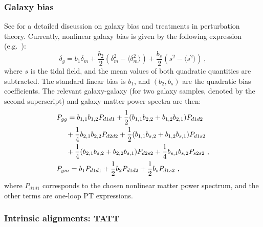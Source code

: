 \documentclass[\docopts]{\docclass}
\begin{document}
\subsubsection{Galaxy bias}
See \cite{desjacques18rev} for a detailed discussion on galaxy bias and treatments in perturbation theory. Currently, nonlinear galaxy bias is given by the following expression (e.g.\ \citealp{baldauf12}):
\begin{equation}
  \delta_{g} = b_1 \delta_m +\frac{b_2}{2} (\delta_m^2 - \langle \delta_m^2 \rangle) +
  \frac{b_s}{2} (s^2 - \langle s^2 \rangle) ~,
\end{equation}
where $s$ is the tidal field, and the mean values of both quadratic quantities are subtracted.
The standard linear bias is $b_1$, and $(b_2,b_s)$ are the quadratic bias coefficients.
The relevant galaxy-galaxy (for two galaxy samples, denoted by the second superscript) and galaxy-matter power spectra are then:
\begin{align}
  &P_{gg} = b_{1,1} b_{1,2} P_{d1d1} +
               \frac{1}{2} (b_{1,1} b_{2,2} + b_{1,2} b_{2,1}) P_{d1d2} \notag\\
               &~~~~ + \frac{1}{4} b_{2,1} b_{2,2} P_{d2d2} +
               \frac{1}{2} (b_{1,1} b_{s,2} + b_{1,2} b_{s,1}) P_{d1s2} \notag\\
               &~~~~ + \frac{1}{4} (b_{2,1} b_{s,2} + b_{2,2} b_{s,1}) P_{d2s2} +
               \frac{1}{4} b_{s,1} b_{s,2} P_{s2s2}~,\\
  &P_{gm} = b_1 P_{d1d1} + \frac{1}{2}b_2 P_{d1d2} + \frac{1}{2} b_s P_{d1s2}~,
\end{align}
where $P_{d1d1}$ corresponds to the chosen nonlinear matter power spectrum,
and the other terms are one-loop PT expressions.

\subsubsection{Intrinsic alignments: TATT}
\end{document}
